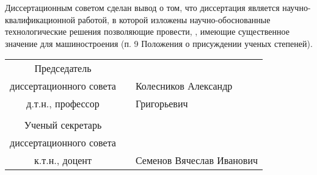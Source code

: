 










Диссертационным советом сделан вывод о том, что диссертация является научно-квалификационной работой, в которой изложены научно-обоснованные технологические решения позволяющие провести, \MakeLowercase{{\thesisTitle}}, имеющие существенное значение для машиностроения (п. 9 Положения о присуждении ученых степеней).

\vspace*{4.5em plus .6em minus .5em}

\begin{center}
\begin{tabular}[c]{c m{4cm} l}
	
	     Председатель       &  												\\
	диссертационного совета &  			 & Колесников Александр				\\
	   д.т.н., профессор    & \hrulefill & Григорьевич 						\\			
	                        &            &                    			    \\
	   Ученый секретарь     &  												\\
	диссертационного совета &  												\\
	    к.т.н., доцент      & \hrulefill & Семенов Вячеслав Иванович
	    
\end{tabular}
\end{center}


%
\clearpage